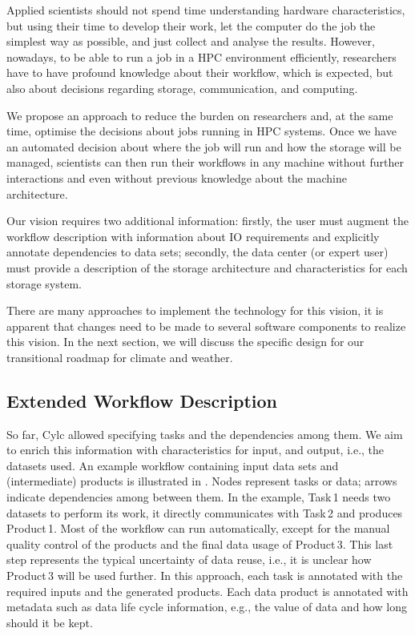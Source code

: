 \documentclass[a4paper]{article}
\begin{document}
Applied scientists should not spend time understanding hardware characteristics, but using their time to develop their work, let the computer do the job the simplest way as possible, and just collect and analyse the results.
However, nowadays, to be able to run a job in a HPC environment efficiently, researchers have to have profound knowledge about their workflow, which is expected, but also about decisions regarding storage, communication, and computing.

We propose an approach to reduce the burden on researchers and, at the same time, optimise the decisions about jobs running in HPC systems.
Once we have an automated decision about where the job will run and how the storage will be managed, scientists can then run their workflows in any machine without further interactions and even without previous knowledge about the machine architecture.

Our vision requires two additional information: firstly, the user must augment the workflow description with information about IO requirements and explicitly annotate dependencies to data sets; secondly, the data center (or expert user) must provide a description of the storage architecture and characteristics for each storage system.

There are many approaches to implement the technology for this vision, it is apparent that changes need to be made to several software components to realize this vision.
In the next section, we will discuss the specific design for our transitional roadmap for climate and weather.


\subsection{Extended Workflow Description}

So far, Cylc allowed specifying tasks and the dependencies among them.
We aim to enrich this information with characteristics for input, and output, i.e., the datasets used.
An example workflow containing input data sets and (intermediate) products is illustrated in .
Nodes represent tasks or data; arrows indicate dependencies among between them.
In the example, Task\,1 needs two datasets to perform its work, it directly communicates with Task\,2 and produces Product\,1.
Most of the workflow can run automatically, except for the manual quality control of the products and the final data usage of Product\,3.
This last step represents the typical uncertainty of data reuse, i.e., it is unclear how Product\,3 will be used further.
In this approach, each task is annotated with the required inputs and the generated products.
Each data product is annotated with metadata such as data life cycle information, e.g., the value of data and how long should it be kept.
\end{document}
